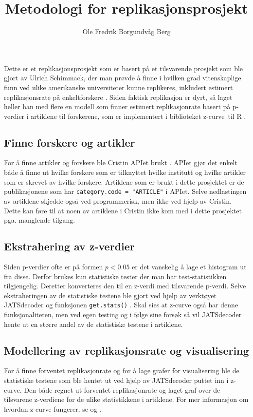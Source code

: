 \documentclass[doc,norsk]{apa7}
\title{Metodologi for replikasjonsprosjekt}
\author{Ole Fredrik Borgundvåg Berg}
\affiliation{NTNU}
\begin{document}
\maketitle

Dette er et replikasjonsprosjekt som er basert på et tilsvarende prosjekt som ble gjort av Ulrich Schimmack, der man prøvde å finne i hvilken grad vitenskaplige funn ved ulike amerikanske universiteter kunne replikeres, inkludert estimert replikasjonsrate på enkeltforskere \parencite{amerikansk-ranking}. Siden faktisk replikasjon er dyrt, så laget heller han med flere en modell som finner estimert replikasjonrate basert på p-verdier i artiklene til forskerene, som er implementert i biblioteket \guillemetleft z-curve\guillemetright\ til R \parencite{z-curve-modell, z-curve-implementasjon}.

\subsection{Finne forskere og artikler}
For å finne artikler og forskere ble Cristin APIet brukt \parencite{cristin-api}. APIet gjør det enkelt både å finne ut hvilke forskere som er tilknyttet hvilke institutt og hvilke artikler som er skrevet av hvilke forskere. Artiklene som er brukt i dette prosjektet er de publikasjonene som har \texttt{category.code = "ARTICLE"} i APIet. Selve nedlastingen av artiklene skjedde også ved programmerisk, men ikke ved hjelp av Cristin. Dette kan føre til at noen av artiklene i Cristin ikke kom med i dette prosjektet pga. manglende tilgang.

\subsection{Ekstrahering av z-verdier}
Siden p-verdier ofte er på formen $p < 0.05$ er det vanskelig å lage et histogram ut fra disse. Derfor brukes kun statistiske tester der man har test-statistikken tilgjengelig. Deretter konverteres den til en z-verdi med tilsvarende p-verdi. Selve ekstraheringen av de statistiske testene ble gjort ved hjelp av verktøyet JATSdecoder og funksjonen \texttt{get.stats()} \parencite{jatsdecoder}. Skal sies at z-curve også har denne funksjonaliteten, men ved egen testing og i følge \textcite{jatsdecoder} sine forsøk så vil JATSdecoder hente ut en større andel av de statistiske testene i artiklene.

\subsection{Modellering av replikasjonsrate og visualisering}
For å finne forventet replikasjonrate og for å lage grafer for visualisering ble de statistiske testene som ble hentet ut ved hjelp av JATSdecoder puttet inn i z-curve. Den både regnet ut forventet replikasjonrate og laget graf over de tilsvarene z-verdiene for de ulike statistikkene i artiklene. For mer informasjon om hvordan z-curve fungerer, se \textcite{z-curve-modell} og \textcite{z-curve-implementasjon}. 
\end{document}
